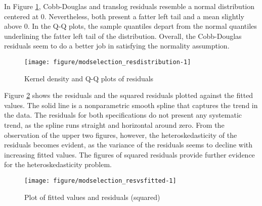 \documentclass[12pt,a4paper]{article}\usepackage[]{graphicx}\usepackage[]{color}
\newenvironment{knitrout}{}{} %
\begin{document}
In Figure \ref{fig:modselection_resdistribution}, Cobb-Douglas and translog residuals resemble a normal distribution centered at 0. Nevertheless, both present a fatter left tail and a mean slightly above 0. In the Q-Q plots, the sample quantiles depart from the normal quantiles underlining the fatter left tail of the distribution. Overall, the Cobb-Douglas residuals seem to do a better job in satisfying the normality assumption.

\begin{knitrout}
\color{fgcolor}\begin{figure}[htbp]

{\centering \texttt{[image: figure/modselection\_resdistribution-1]} 

}

\caption[Kernel density and Q-Q plots of residuals]{Kernel density and Q-Q plots of residuals}\label{fig:modselection_resdistribution}
\end{figure}


\end{knitrout}





Figure \ref{fig:modselection_resvsfitted} shows the residuals and the squared residuals plotted against the fitted values. The solid line is a nonparametric smooth spline that captures the trend in the data. The residuals for both specifications do not present any systematic trend, as the spline runs straight and horizontal around zero. From the observation of the upper two figures, however, the heteroskedasticity of the residuals becomes evident, as the variance of the residuals seems to decline with increasing fitted values. The figures of squared residuals provide further evidence for the heteroskedasticity problem.

\begin{knitrout}
\color{fgcolor}\begin{figure}[htbp]

{\centering \texttt{[image: figure/modselection\_resvsfitted-1]} 

}

\caption[Plot of fitted values and residuals (squared)]{Plot of fitted values and residuals (squared)}\label{fig:modselection_resvsfitted}
\end{figure}


\end{knitrout}
\end{document}
